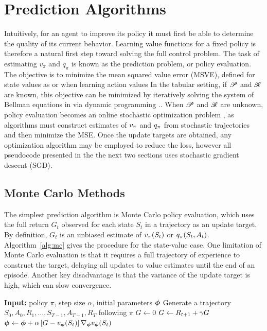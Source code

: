   \section{Prediction Algorithms} \label{sec:prediction}
  Intuitively, for an agent to improve its policy it must first be able to determine the quality of its current behavior. Learning value functions for a fixed policy is therefore a natural first step toward solving the full control problem. The task of estimating $v_\pi$ and $q_\pi$ is known as the prediction problem, or policy evaluation. The objective is to minimize the mean squared value error (MSVE), defined for state values as
  or when learning action values
  In the tabular setting, if $\mathscr{P}$ and $\mathscr{R}$ are known, this objective can be minimized by iteratively solving the system of Bellman equations in  via dynamic programming \cite{sutton1998introduction}.. When $\mathscr{P}$ and $\mathscr{R}$ are unknown, policy evaluation becomes an online stochastic optimization problem , as algorithms must construct estimates of $v_{\pi}$ and $q_{\pi}$ from stochastic trajectories and then minimize the MSE. Once the update targets are obtained, any optimization algorithm may be employed to reduce the loss, however all pseudocode presented in the the next two sections uses stochastic gradient descent (SGD). 
  
  \subsection{Monte Carlo Methods}
  The simplest prediction algorithm is Monte Carlo policy evaluation, which uses the full return $G_t$ observed for each state $S_t$ in a trajectory as an update target. By definition, $G_t$ is an unbiased estimate of $v_{\pi}(S_t)$ or $q_{\pi}(S_t, A_t)$. Algorithm~\ref{alg:mc} gives the procedure for the state-value case. One limitation of Monte Carlo evaluation is that it requires a full trajectory of experience to construct the target, delaying all updates to value estimates until the end of an episode. Another key disadvantage is that the variance of the update target is high, which can slow convergence.
  
  \begin{algorithm}[t]
  \caption{Monte Carlo Policy Evaluation}
  \label{alg:mc}
  \begin{algorithmic}[1]
  \State \textbf{Input:} policy $\pi$, step size $\alpha$, initial parameters ${\bm \phi}$
      \State Generate a trajectory $S_0, A_0, R_1, \dots, S_{T-1}, A_{T-1}, R_T$ following $\pi$
      \State $G \gets 0$
          \State $G \gets R_{t+1} + \gamma G$
          \State ${\bm \phi} \gets {\bm \phi} + \alpha \left[ G - v_{\bm \phi}(S_t) \right] \nabla_{{\bm \phi}} v_{\bm \phi}(S_t)$
      \EndFor
  \EndFor
  \end{algorithmic}
  \end{algorithm}
  
